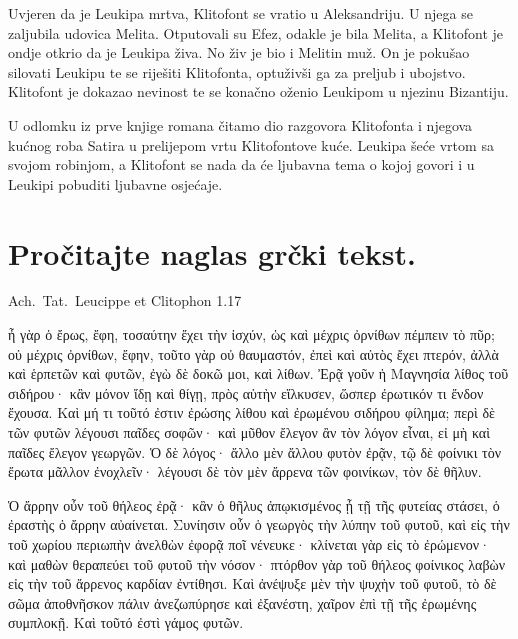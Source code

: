Uvjeren da je Leukipa mrtva, Klitofont se vratio u Aleksandriju. U njega se zaljubila udovica Melita. Otputovali su Efez, odakle je bila Melita, a Klitofont je ondje otkrio da je Leukipa živa. No živ je bio i Melitin muž. On je pokušao silovati Leukipu te se riješiti Klitofonta, optuživši ga za preljub i ubojstvo. Klitofont je dokazao nevinost te se konačno oženio Leukipom u njezinu Bizantiju. 

U odlomku iz prve knjige romana čitamo dio razgovora Klitofonta i njegova kućnog roba Satira u prelijepom vrtu Klitofontove kuće. Leukipa šeće vrtom sa svojom robinjom, a Klitofont se nada da će ljubavna tema o kojoj govori i u Leukipi pobuditi ljubavne osjećaje.



\section*{Pročitajte naglas grčki tekst.}

Ach.~Tat.\ Leucippe et Clitophon 1.17


\medskip


{\large

\begin{greek}

\noindent ἦ γὰρ ὁ ἔρως, ἔφη, τοσαύτην ἔχει τὴν ἰσχύν, ὡς καὶ μέχρις ὀρνίθων πέμπειν τὸ πῦρ; οὐ μέχρις ὀρνίθων, ἔφην, τοῦτο γὰρ οὐ θαυμαστόν, ἐπεὶ καὶ αὐτὸς ἔχει πτερόν, ἀλλὰ καὶ ἑρπετῶν καὶ φυτῶν, ἐγὼ δὲ δοκῶ μοι, καὶ λίθων. Ἐρᾷ γοῦν ἡ Μαγνησία λίθος τοῦ σιδήρου· κἂν μόνον ἴδῃ καὶ θίγῃ, πρὸς αὑτὴν εἵλκυσεν, ὥσπερ ἐρωτικόν τι ἔνδον ἔχουσα. Καὶ μή τι τοῦτό ἐστιν ἐρώσης λίθου καὶ ἐρωμένου σιδήρου φίλημα; περὶ δὲ τῶν φυτῶν λέγουσι παῖδες σοφῶν· καὶ μῦθον ἔλεγον ἂν τὸν λόγον εἶναι, εἰ μὴ καὶ παῖδες ἔλεγον γεωργῶν. Ὁ δὲ λόγος· ἄλλο μὲν ἄλλου φυτὸν ἐρᾷν, τῷ δὲ φοίνικι τὸν ἔρωτα μᾶλλον ἐνοχλεῖν· λέγουσι δὲ τὸν μὲν ἄρρενα τῶν φοινίκων, τὸν δὲ θῆλυν.

\noindent Ὁ ἄρρην οὖν τοῦ θήλεος ἐρᾷ· κἂν ὁ θῆλυς ἀπῳκισμένος ᾖ τῇ τῆς φυτείας στάσει, ὁ ἐραστὴς ὁ ἄρρην αὐαίνεται. Συνίησιν οὖν ὁ γεωργὸς τὴν λύπην τοῦ φυτοῦ, καὶ εἰς τὴν τοῦ χωρίου περιωπὴν ἀνελθὼν ἐφορᾷ ποῖ νένευκε· κλίνεται γὰρ εἰς τὸ ἐρώμενον· καὶ μαθὼν θεραπεύει τοῦ φυτοῦ τὴν νόσον· πτόρθον γὰρ τοῦ θήλεος φοίνικος λαβὼν εἰς τὴν τοῦ ἄρρενος καρδίαν ἐντίθησι. Καὶ ἀνέψυξε μὲν τὴν ψυχὴν τοῦ φυτοῦ, τὸ δὲ σῶμα ἀποθνῆσκον πάλιν ἀνεζωπύρησε καὶ ἐξανέστη, χαῖρον ἐπὶ τῇ τῆς ἐρωμένης  συμπλοκῇ. Καὶ τοῦτό ἐστὶ γάμος φυτῶν.

\end{greek}

}


